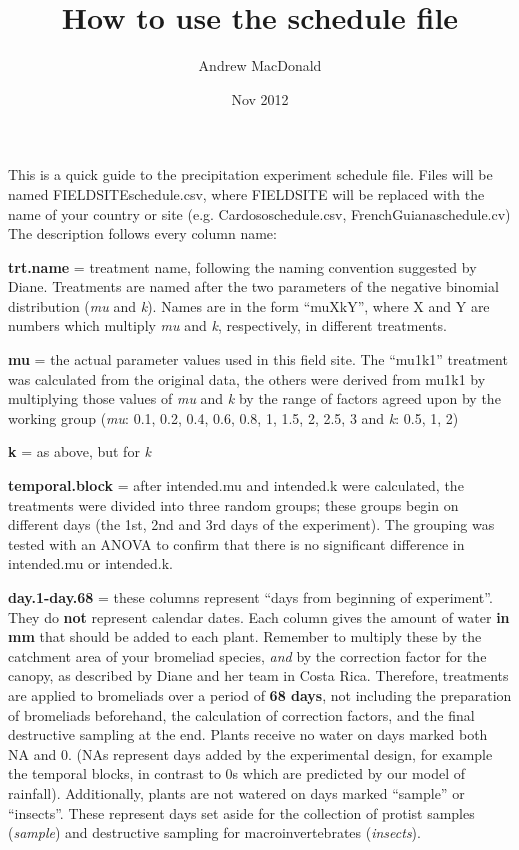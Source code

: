 \documentclass[12pt]{article}
\title{How to use the schedule file}
\author{Andrew MacDonald}
\date{Nov 2012}
\begin{document}
\maketitle


This is a quick guide to the precipitation experiment schedule
file. Files will be named FIELDSITEschedule.csv, where FIELDSITE will
be replaced with the name of your country or site
(e.g. Cardososchedule.csv, FrenchGuianaschedule.cv) The description
follows every column name:


\textbf{trt.name} = treatment name, following the naming convention
suggested by Diane.  Treatments are named after the two parameters of
the negative binomial distribution (\emph{mu} and \emph{k}).
Names are in the form ``muXkY'', where X and Y are numbers which
multiply \emph{mu} and \emph{k}, respectively, in different
treatments.

\textbf{mu} = the actual parameter values used in this field
site. The ``mu1k1'' treatment was calculated from the original data,
the others were derived from mu1k1 by multiplying those values of
\emph{mu} and \emph{k} by the range of factors agreed upon by the
working group (\emph{mu}: 0.1, 0.2, 0.4, 0.6, 0.8, 1, 1.5, 2, 2.5, 3
and \emph{k}: 0.5, 1, 2)

\textbf{k} = as above, but for \emph{k}

\textbf{temporal.block} = after intended.mu and intended.k were
calculated, the treatments were divided into three random groups;
these groups begin on different days (the 1st, 2nd and 3rd days of the
experiment).  The grouping was tested with an ANOVA to confirm that
there is no significant difference in intended.mu or intended.k.

\textbf{day.1-day.68} = these columns represent ``days from beginning of
experiment''. They do \textbf{not} represent calendar dates.  Each
column gives the amount of water \textbf{in mm} that should be added
to each plant.  Remember to multiply these by the catchment area of
your bromeliad species, \emph{and} by the correction factor for the
canopy, as described by Diane and her team in Costa Rica.  Therefore,
treatments are applied to bromeliads over a period of \textbf{68
  days}, not including the preparation of bromeliads beforehand, the
calculation of correction factors, and the final destructive sampling
at the end.  Plants receive no water on days marked both NA and 0.
(NAs represent days added by the experimental design, for example the
temporal blocks, in contrast to 0s which are predicted by our model of
rainfall).  Additionally, plants are not watered on days marked
``sample'' or ``insects''.  These represent days set aside for the
collection of protist samples (\emph{sample}) and destructive sampling for
macroinvertebrates (\emph{insects}).
\end{document}
